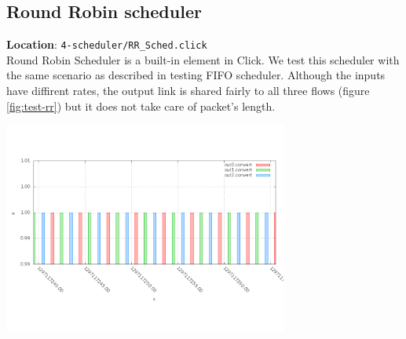 \documentclass[a4paper]{article}
\begin{document}
  \subsection{Round Robin scheduler}
  \textbf{Location}: \texttt{4-scheduler/RR\_Sched.click}\\
  Round Robin Scheduler is a built-in element in Click. We test this scheduler with the same scenario as described in testing FIFO scheduler. Although the inputs have diffirent rates, the output link is shared fairly to all three flows (figure \ref{fig:test-rr}) but it does not take care of packet's length.
  \begin{center}
	\includegraphics[height=0.3\textheight, width=0.70\textwidth]{rr-dense.png}
	\label{fig:test-rr}
  \end{center}
  
\end{document}
